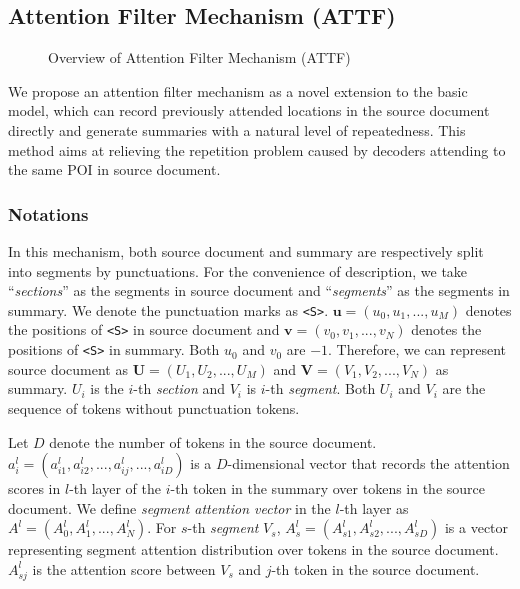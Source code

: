 \subsection{Attention Filter Mechanism (ATTF)}
\label{sec:attf}

\begin{figure}[th]
	\centering
	\caption{Overview of Attention Filter Mechanism (ATTF)}
	\label{fig:model_main}
\end{figure}


\label{sec:attnf}
We propose an attention filter mechanism as a novel extension 
to the basic model,
which can record previously attended locations 
in the source document directly and generate summaries 
with a natural level of repeatedness. 
This method aims at relieving the repetition problem caused by 
decoders attending to the same POI in source document.

\subsubsection{Notations}
In this mechanism, both source document and summary are 
respectively split into segments by punctuations. 
For the convenience of description, 
we take ``{\em sections}'' as the segments in source document and ``{\em segments}'' as the segments in summary. 
We denote the punctuation marks as \verb#<S>#.
$\mathbf{u}=(u_{0},u_{1},...,u_{M})$ 
denotes the positions of \verb#<S># in source document and $\mathbf{v}=(v_{0},v_{1},...,v_{N})$ denotes the positions of \verb#<S># in summary.
Both $u_{0}$ and $v_{0}$ are $-1$.
Therefore, we can represent source document as $\mathbf{U}=(U_{1},U_{2},...,U_{M})$ and $\mathbf{V}=(V_{1},V_{2},...,V_{N})$ as summary.
$U_i$ is the $i$-th {\em section} and 
$V_i$ is $i$-th {\em segment}.
Both $U_i$ and $V_i$ are the sequence of 
tokens without punctuation tokens.

Let $D$ denote the number of tokens in the source document.
$a_i^l=(a_{i1}^l, a_{i2}^l,..., a_{ij}^l,..., a_{iD}^l)$ is a $D$-dimensional vector that records 
the attention scores in $l$-th layer of the $i$-th token in the summary over 
tokens in the source document.
We define \textit{segment attention vector} in the $l$-th layer as 
$A^{l}=(A_{0}^{l}, A_{1}^{l},..., A_{N}^{l})$.
For $s$-th \textit{segment} $V_s$, 
$A_s^l=(A^l_{s1}, A^l_{s2},...,A^l_{sD})$ 
is a vector representing 
segment attention distribution
over tokens in the source document.
$A^l_{sj}$ is the attention score between $V_s$ and $j$-th token in the source document.


